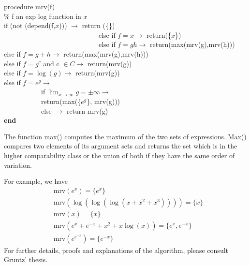\begin{flushleft}
procedure mrv(f) \\
\% f an exp log function in $x$ \\
if (not (depend(f,$x$))) $\rightarrow$ return (\{\}) \\
~~~~~~~~~~~~~~~~~~~~~~~~~~~~else if $f=x \rightarrow$ return(\{$x$\}) \\
~~~~~~~~~~~~~~~~~~~~~~~~~~~~else if $f=gh \rightarrow$ return(max(mrv(g),mrv(h))) \\
else if $f=g+h \rightarrow$ return(max(mrv(g),mrv(h))) \\
else if $f=g^{c}$ and c $\in C \rightarrow$ return(mrv(g)) \\
else if $f=\log(g) \rightarrow$ return(mrv(g)) \\
else if $f=e^{g} \rightarrow$ \\
~~~~~~~~~~~if $\lim_{x \rightarrow \infty} g=\pm\infty \rightarrow$ \\
~~~~~~~~~~~return(max(\{$e^{g}$\}, mrv(g))) \\
~~~~~~~~~~~else $\rightarrow$ return mrv(g) \\
\textbf{end}
\end{flushleft}

The function max() computes the maximum of the two sets of
expressions. Max() compares two elements of its argument sets and
returns the set which is in the higher comparability class or the
union of both if they have the same order of variation.

For example, we have
\begin{align*}
&\text{mrv}(e^{x})=\{e^x\} \\
&\text{mrv}(\log(\log(\log(x+x^2+x^3))))=\{x\}  \\
&\text{mrv}(x)=\{x\} \\
&\text{mrv}(e^x+e^{-x}+x^2+x \log(x))= \{e^x,e^{-x} \} \\
&\text{mrv}(e^{e^{-x}})=\{e^{-x} \}
\end{align*}
For further details, proofs and explanations of the algorithm, please consult Gruntz' thesis\cite{Gruntz:96}.


